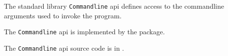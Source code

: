 
The standard library {\tt Commandline} api defines access to the commandline 
arguments used to invoke the program.

The {\tt Commandline} api is implemented by the  package.

The {\tt Commandline} api source code is in .







